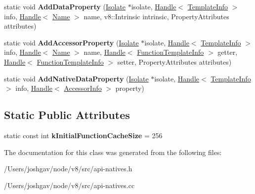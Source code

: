 \begin{DoxyCompactItemize}
\item 
static void {\bfseries Add\+Data\+Property} (\hyperlink{classv8_1_1internal_1_1_isolate}{Isolate} $\ast$isolate, \hyperlink{classv8_1_1internal_1_1_handle}{Handle}$<$ \hyperlink{classv8_1_1internal_1_1_template_info}{Template\+Info} $>$ info, \hyperlink{classv8_1_1internal_1_1_handle}{Handle}$<$ \hyperlink{classv8_1_1internal_1_1_name}{Name} $>$ name, v8\+::\+Intrinsic intrinsic, Property\+Attributes attributes)\hypertarget{classv8_1_1internal_1_1_api_natives_a00f025df8155d3f3aa5949422109f23e}{}\label{classv8_1_1internal_1_1_api_natives_a00f025df8155d3f3aa5949422109f23e}

\item 
static void {\bfseries Add\+Accessor\+Property} (\hyperlink{classv8_1_1internal_1_1_isolate}{Isolate} $\ast$isolate, \hyperlink{classv8_1_1internal_1_1_handle}{Handle}$<$ \hyperlink{classv8_1_1internal_1_1_template_info}{Template\+Info} $>$ info, \hyperlink{classv8_1_1internal_1_1_handle}{Handle}$<$ \hyperlink{classv8_1_1internal_1_1_name}{Name} $>$ name, \hyperlink{classv8_1_1internal_1_1_handle}{Handle}$<$ \hyperlink{classv8_1_1internal_1_1_function_template_info}{Function\+Template\+Info} $>$ getter, \hyperlink{classv8_1_1internal_1_1_handle}{Handle}$<$ \hyperlink{classv8_1_1internal_1_1_function_template_info}{Function\+Template\+Info} $>$ setter, Property\+Attributes attributes)\hypertarget{classv8_1_1internal_1_1_api_natives_a6934eedf60bf86e845fd9f483839191c}{}\label{classv8_1_1internal_1_1_api_natives_a6934eedf60bf86e845fd9f483839191c}

\item 
static void {\bfseries Add\+Native\+Data\+Property} (\hyperlink{classv8_1_1internal_1_1_isolate}{Isolate} $\ast$isolate, \hyperlink{classv8_1_1internal_1_1_handle}{Handle}$<$ \hyperlink{classv8_1_1internal_1_1_template_info}{Template\+Info} $>$ info, \hyperlink{classv8_1_1internal_1_1_handle}{Handle}$<$ \hyperlink{classv8_1_1internal_1_1_accessor_info}{Accessor\+Info} $>$ property)\hypertarget{classv8_1_1internal_1_1_api_natives_aa3f534fe84b42a099d7af3d7dae423c5}{}\label{classv8_1_1internal_1_1_api_natives_aa3f534fe84b42a099d7af3d7dae423c5}

\end{DoxyCompactItemize}
\subsection*{Static Public Attributes}
\begin{DoxyCompactItemize}
\item 
static const int {\bfseries k\+Initial\+Function\+Cache\+Size} = 256\hypertarget{classv8_1_1internal_1_1_api_natives_aca69c9efcc2949a8eb362d0fe599b4b9}{}\label{classv8_1_1internal_1_1_api_natives_aca69c9efcc2949a8eb362d0fe599b4b9}

\end{DoxyCompactItemize}


The documentation for this class was generated from the following files\+:\begin{DoxyCompactItemize}
\item 
/\+Users/joshgav/node/v8/src/api-\/natives.\+h\item 
/\+Users/joshgav/node/v8/src/api-\/natives.\+cc\end{DoxyCompactItemize}
